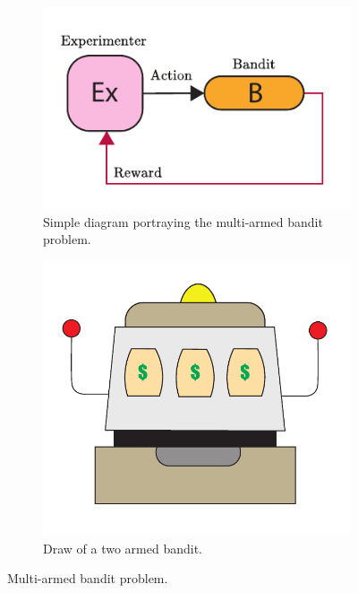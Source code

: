\documentclass[11pt,a4paper,twoside]{report}
\newcommand{\+}{\textnormal{+} }
\theoremstyle{definition}
\numberwithin{equation}{chapter}
\begin{document}
\begin{figure}[t]
  \centering
  \begin{subfigure}{.5\textwidth}
    \centering
    \includegraphics[width=1\linewidth]{figures/Bandit.pdf}
    \caption{Simple diagram portraying the multi-armed bandit problem.}
  \end{subfigure}
  \begin{subfigure}{.5\textwidth}
    \centering
    \includegraphics[width=1\linewidth]{figures/Bandit-Draw.pdf}
    \caption{Draw of a two armed bandit.}
  \end{subfigure}
  \caption{Multi-armed bandit problem.}
  \end{figure}
\end{document}

